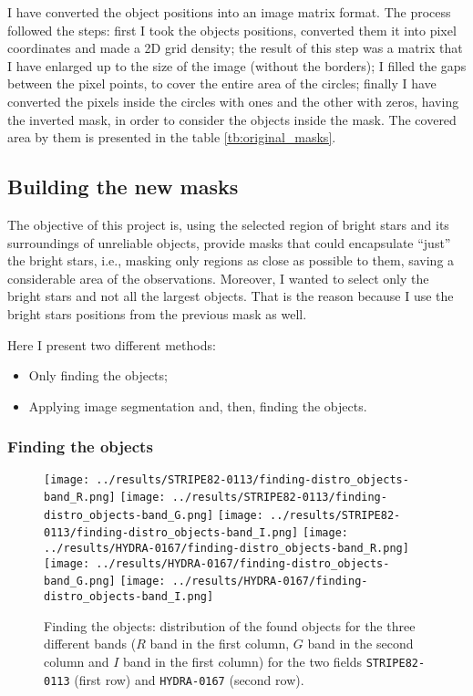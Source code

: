 \documentclass{article}
\begin{document}
I have converted the object positions into an image matrix format. The process followed the steps: first I took the objects positions, converted them it into pixel coordinates and made a 2D grid density; the result of this step was a matrix that I have enlarged up to the size of the image (without the borders); I filled the gaps between the pixel points, to cover the entire area of the circles; finally I have converted the pixels inside the circles with ones and the other with zeros, having the inverted mask, in order to consider the objects inside the mask. The covered area by them is presented in the table \ref{tb:original_masks}. 

\subsection{Building the new masks}

The objective of this project is, using the selected region of bright stars and its surroundings of unreliable objects, provide masks that could encapsulate ``just'' the bright stars, i.e., masking only regions as close as possible to them, saving a considerable area of the observations. Moreover, I wanted to select only the bright stars and not all the largest objects. That is the reason because I use the bright stars positions from the previous mask as well.

Here I present two different methods:
\begin{itemize}
 \item Only finding the objects;
 \item Applying image segmentation and, then, finding the objects. 
\end{itemize}

\subsubsection{Finding the objects}

\begin{figure}[h!]
  \centering
  \texttt{[image: ../results/STRIPE82-0113/finding-distro\_objects-band\_R.png]}
  \texttt{[image: ../results/STRIPE82-0113/finding-distro\_objects-band\_G.png]}
  \texttt{[image: ../results/STRIPE82-0113/finding-distro\_objects-band\_I.png]}
  \texttt{[image: ../results/HYDRA-0167/finding-distro\_objects-band\_R.png]}
  \texttt{[image: ../results/HYDRA-0167/finding-distro\_objects-band\_G.png]}
  \texttt{[image: ../results/HYDRA-0167/finding-distro\_objects-band\_I.png]}
  \caption{Finding the objects: distribution of the found objects for the three different bands ($R$ band in the first column, $G$ band in the second column and $I$ band in the first column) for the two fields \texttt{STRIPE82-0113} (first row) and \texttt{HYDRA-0167} (second row).}
  \label{fig:distro_finding}
\end{figure}
\end{document}
